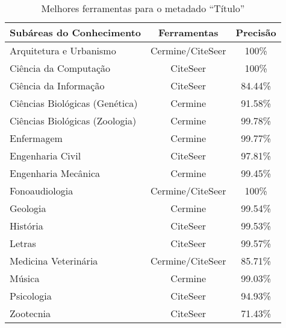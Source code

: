 \begin{table}[h!]
    \caption{Melhores ferramentas para o metadado ``Título''}
    \begin{center}
        \begin{tabular}{|l|c|c|}
            \hline 
            \textbf{Subáreas do Conhecimento} & \textbf{Ferramentas} & \textbf{Precisão} \\ 
            \hline 
            Arquitetura e Urbanismo & Cermine/CiteSeer & 100\% \\ \hline
            Ciência da Computação & CiteSeer & 100\% \\ \hline
            Ciência da Informação & CiteSeer & 84.44\% \\ \hline
            Ciências Biológicas (Genética) & Cermine & 91.58\% \\ \hline
            Ciências Biológicas (Zoologia) & Cermine & 99.78\% \\ \hline
            Enfermagem & Cermine & 99.77\% \\ \hline
            Engenharia Civil & CiteSeer & 97.81\% \\ \hline
            Engenharia Mecânica & Cermine & 99.45\% \\ \hline
            Fonoaudiologia & Cermine/CiteSeer & 100\% \\ \hline
            Geologia & Cermine & 99.54\% \\ \hline
            História & CiteSeer & 99.53\% \\ \hline
            Letras & CiteSeer & 99.57\% \\ \hline
            Medicina Veterinária & Cermine/CiteSeer & 85.71\% \\ \hline
            Música & Cermine & 99.03\% \\ \hline
            Psicologia & CiteSeer & 94.93\% \\ \hline
            Zootecnia & CiteSeer & 71.43\% \\ \hline
        \end{tabular}
    \end{center}
    \label{tab:areas-title-tools}
\end{table}

